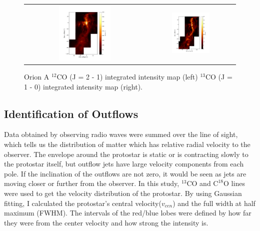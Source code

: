 \begin{figure}[t]
	\begin{center}
		\begin{tabular}{cc}
			\includegraphics[width=0.45\textwidth]{RNE_12CO_Orion} & \includegraphics[width=0.45\textwidth]{Orion_13CO_intmap}
		\end{tabular}
	\end{center}
	\caption{Orion A $^{12}$CO (J = 2 - 1) integrated intensity map (left) $^{13}$CO (J = 1 - 0) integrated intensity map (right).}
	\label{fig:map1}  %
\end{figure}

\subsection{Identification of Outflows}
Data obtained by observing radio waves were summed over the line of sight, which tells us the distribution of matter which has relative radial velocity to the observer. The envelope around the protostar is static or is contracting slowly to the protostar itself, but outflow jets have large velocity components from each pole. If the inclination of the outflows are not zero, it would be seen as jets are moving closer or further from the observer. 
In this study, $^{13}$CO and $\textrm{C}^{18}\textrm{O}$ lines were used to get the velocity distribution of the protostar. By using Gaussian fitting, I calculated the protostar’s central velocity($v_{cen}$) and the full width at half maximum (FWHM). The intervals of the red/blue lobes were defined by how far they were from the center velocity and how strong the intensity is.

